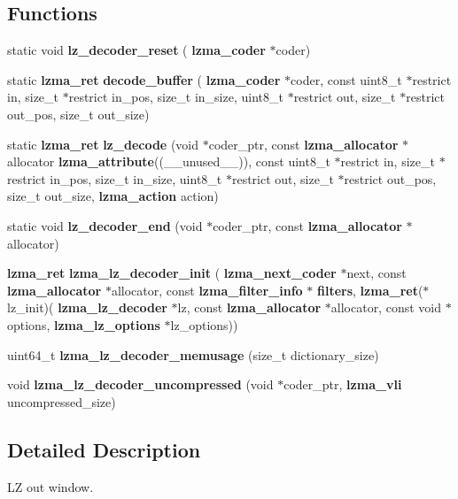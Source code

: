 \subsection*{Functions}
\begin{DoxyCompactItemize}
\item 
\mbox{\label{lz__decoder_8c_a846b635a30e69070cf612edb6d937c06}} 
static void {\bfseries lz\+\_\+decoder\+\_\+reset} (\textbf{ lzma\+\_\+coder} $\ast$coder)
\item 
\mbox{\label{lz__decoder_8c_a422ae264c308820bc1e19499aa4460be}} 
static \textbf{ lzma\+\_\+ret} {\bfseries decode\+\_\+buffer} (\textbf{ lzma\+\_\+coder} $\ast$coder, const uint8\+\_\+t $\ast$restrict in, size\+\_\+t $\ast$restrict in\+\_\+pos, size\+\_\+t in\+\_\+size, uint8\+\_\+t $\ast$restrict out, size\+\_\+t $\ast$restrict out\+\_\+pos, size\+\_\+t out\+\_\+size)
\item 
\mbox{\label{lz__decoder_8c_a94720dbf79918c2e25b8781e78e45464}} 
static \textbf{ lzma\+\_\+ret} {\bfseries lz\+\_\+decode} (void $\ast$coder\+\_\+ptr, const \textbf{ lzma\+\_\+allocator} $\ast$allocator \textbf{ lzma\+\_\+attribute}((\+\_\+\+\_\+unused\+\_\+\+\_\+)), const uint8\+\_\+t $\ast$restrict in, size\+\_\+t $\ast$restrict in\+\_\+pos, size\+\_\+t in\+\_\+size, uint8\+\_\+t $\ast$restrict out, size\+\_\+t $\ast$restrict out\+\_\+pos, size\+\_\+t out\+\_\+size, \textbf{ lzma\+\_\+action} action)
\item 
\mbox{\label{lz__decoder_8c_ae2303970e48b10aff295d7410c98045a}} 
static void {\bfseries lz\+\_\+decoder\+\_\+end} (void $\ast$coder\+\_\+ptr, const \textbf{ lzma\+\_\+allocator} $\ast$allocator)
\item 
\mbox{\label{lz__decoder_8c_a12e91e9d8a15d26186dd608af7a98339}} 
\textbf{ lzma\+\_\+ret} {\bfseries lzma\+\_\+lz\+\_\+decoder\+\_\+init} (\textbf{ lzma\+\_\+next\+\_\+coder} $\ast$next, const \textbf{ lzma\+\_\+allocator} $\ast$allocator, const \textbf{ lzma\+\_\+filter\+\_\+info} $\ast$\textbf{ filters}, \textbf{ lzma\+\_\+ret}($\ast$lz\+\_\+init)(\textbf{ lzma\+\_\+lz\+\_\+decoder} $\ast$lz, const \textbf{ lzma\+\_\+allocator} $\ast$allocator, const void $\ast$options, \textbf{ lzma\+\_\+lz\+\_\+options} $\ast$lz\+\_\+options))
\item 
\mbox{\label{lz__decoder_8c_aa715866ca37ce5fd726c391b0da5b882}} 
uint64\+\_\+t {\bfseries lzma\+\_\+lz\+\_\+decoder\+\_\+memusage} (size\+\_\+t dictionary\+\_\+size)
\item 
\mbox{\label{lz__decoder_8c_a0be8d393513982061f74428cd41d872e}} 
void {\bfseries lzma\+\_\+lz\+\_\+decoder\+\_\+uncompressed} (void $\ast$coder\+\_\+ptr, \textbf{ lzma\+\_\+vli} uncompressed\+\_\+size)
\end{DoxyCompactItemize}


\subsection{Detailed Description}
LZ out window. 

